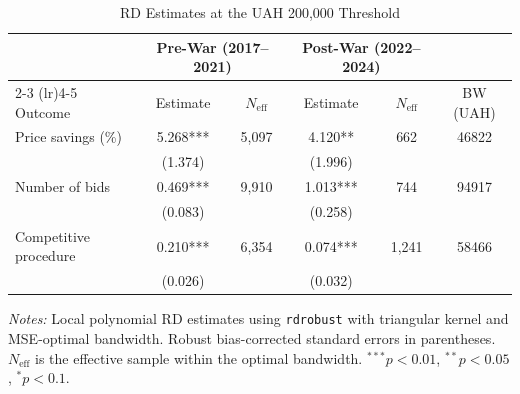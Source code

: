 \begin{table}[htbp]
\centering
\caption{RD Estimates at the UAH 200,000 Threshold}
\label{tab:rd}
\begin{tabular}{lccccc}
\toprule
 & \multicolumn{2}{c}{Pre-War (2017--2021)} & \multicolumn{2}{c}{Post-War (2022--2024)} & \\
\cmidrule(lr){2-3} \cmidrule(lr){4-5}
Outcome & Estimate & $N_{\text{eff}}$ & Estimate & $N_{\text{eff}}$ & BW (UAH) \\
\midrule
Price savings (\%) & 5.268*** & 5,097 & 4.120** & 662 & 46822 \\
 & (1.374) & & (1.996) & & \\
Number of bids & 0.469*** & 9,910 & 1.013*** & 744 & 94917 \\
 & (0.083) & & (0.258) & & \\
Competitive procedure & 0.210*** & 6,354 & 0.074*** & 1,241 & 58466 \\
 & (0.026) & & (0.032) & & \\
\bottomrule
\end{tabular}
\begin{tablenotes}[flushleft]
\small
\item \textit{Notes:} Local polynomial RD estimates using \texttt{rdrobust} with triangular kernel and MSE-optimal bandwidth. Robust bias-corrected standard errors in parentheses. $N_{\text{eff}}$ is the effective sample within the optimal bandwidth. $^{***}p<0.01$, $^{**}p<0.05$, $^{*}p<0.1$.
\end{tablenotes}
\end{table}

